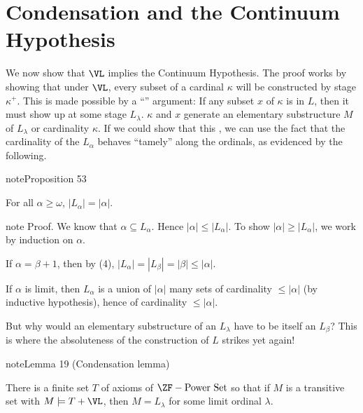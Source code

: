 \documentclass[letterpaper,10pt,english]{jupyterBook}
\begin{document}
\section{Condensation and the Continuum Hypothesis}
\label{\detokenize{V=L:condensation-and-the-continuum-hypothesis}}
\sphinxAtStartPar
We now show that \(\VL\) implies the Continuum Hypothesis. The proof works by showing that under \(\VL\), every subset of a cardinal \(\kappa\) will be constructed by stage \(\kappa^+\). This is made possible by a “” argument: If any subset \(x\) of \(\kappa\) is in \(L\), then it must show up at some stage \(L_\lambda\). \(\kappa\) and \(x\) generate an elementary substructure \(M\) of \(L_\lambda\) or cardinality \(\kappa\). If we could show that this , we can use the fact that the cardinality of the \(L_\alpha\) behaves “tamely” along the ordinals, as evidenced by the following.
\label{V=L:prop-card-Lalpha}
\begin{sphinxadmonition}{note}{Proposition 53}



\sphinxAtStartPar
For all \(\alpha \geq \omega\), \(|L_{\alpha}| = |\alpha|\).
\end{sphinxadmonition}

\begin{sphinxadmonition}{note}
\sphinxAtStartPar
Proof. We know that \(\alpha \subseteq L_\alpha\). Hence \(|\alpha| \leq |L_\alpha|\). To show \(|\alpha| \geq |L_\alpha|\), we work by induction on \(\alpha\).

\sphinxAtStartPar
If \(\alpha = \beta +1\), then by {\hyperref[\detokenize{constructible:prop-basics-L}]{}}(4), \(|L_\alpha| = |L_\beta| = |\beta| \leq |\alpha|\).

\sphinxAtStartPar
If \(\alpha\) is limit, then \(L_\alpha\) is a union of \(|\alpha|\) many sets of cardinality \(\leq |\alpha|\) (by inductive hypothesis), hence of cardinality \(\leq |\alpha|\).
\end{sphinxadmonition}

\sphinxAtStartPar
But why would an elementary substructure of an \(L_\lambda\) have to be itself an \(L_\beta\)? This is where the absoluteness of the construction of \(L\) strikes yet again!
\label{V=L:lem-condensation}
\begin{sphinxadmonition}{note}{Lemma 19 (Condensation lemma)}



\sphinxAtStartPar
There is a finite set \(T\) of axioms of \(\ZF - \text{Power Set}\) so that if \(M\) is a transitive set with \(M\models T + \VL\), then \(M = L_\lambda\) for some limit ordinal \(\lambda\).
\end{sphinxadmonition}
\end{document}
